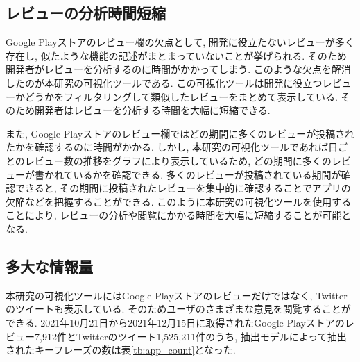 


\subsection{レビューの分析時間短縮}
Google Playストアのレビュー欄の欠点として, 開発に役立たないレビューが多く存在し, 似たような機能の記述がまとまっていないことが挙げられる. そのため開発者がレビューを分析するのに時間がかかってしまう. 
このような欠点を解消したのが本研究の可視化ツールである. この可視化ツールは開発に役立つレビューかどうかをフィルタリングして類似したレビューをまとめて表示している. そのため開発者はレビューを分析する時間を大幅に短縮できる. 

また, Google Playストアのレビュー欄ではどの期間に多くのレビューが投稿されたかを確認するのに時間がかかる. しかし, 本研究の可視化ツールであれば日ごとのレビュー数の推移をグラフにより表示しているため, どの期間に多くのレビューが書かれているかを確認できる. 
多くのレビューが投稿されている期間が確認できると, その期間に投稿されたレビューを集中的に確認することでアプリの欠陥などを把握することができる. 
このように本研究の可視化ツールを使用することにより, レビューの分析や閲覧にかかる時間を大幅に短縮することが可能となる. 

\subsection{多大な情報量}
本研究の可視化ツールにはGoogle Playストアのレビューだけではなく, Twitterのツイートも表示している. そのためユーザのさまざまな意見を閲覧することができる. 
2021年10月21日から2021年12月15日に取得されたGoogle Playストアのレビュー7,912件とTwitterのツイート1,525,211件のうち, 抽出モデルによって抽出されたキーフレーズの数は表\ref{tb:app_count}となった. 

